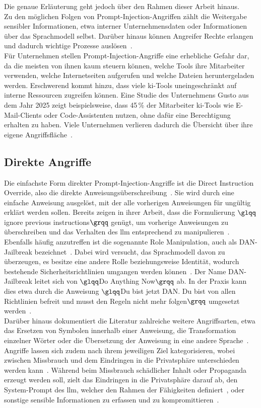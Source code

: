 Die genaue Erläuterung geht jedoch über den Rahmen dieser Arbeit hinaus. \\
Zu den möglichen Folgen von Prompt-Injection-Angriffen zählt die Weitergabe sensibler Informationen, etwa interner Unternehmensdaten oder Informationen über das Sprachmodell selbst.
Darüber hinaus können Angreifer Rechte erlangen und dadurch wichtige Prozesse auslösen~\cite{pi15}. \\
Für Unternehmen stellen Prompt-Injection-Angriffe eine erhebliche Gefahr dar, da die meisten von ihnen kaum steuern können, welche Tools ihre Mitarbeiter verwenden,
welche Internetseiten aufgerufen und welche Dateien heruntergeladen werden. Erschwerend kommt hinzu, dass viele \ac{ki}-Tools uneingeschränkt auf interne Ressourcen zugreifen
können. Eine Studie des Unternehmens Gusto aus dem Jahr 2025 zeigt beispielsweise, dass 45\,\% der Mitarbeiter \ac{ki}-Tools wie E-Mail-Clients oder Code-Assistenten nutzen, ohne
dafür eine Berechtigung erhalten zu haben. Viele Unternehmen verlieren dadurch die Übersicht über ihre eigene Angriffsfläche~\cite{pi21}.


\subsection{Direkte Angriffe}

Die einfachste Form direkter Prompt-Injection-Angriffe ist die Direct Instruction Override, also die direkte Anweisungsüberschreibung~\cite{pi12}.
Sie wird durch eine einfache Anweisung ausgelöst, mit der alle vorherigen Anweisungen für ungültig erklärt werden sollen. Bereits \textcite{pi9}
zeigen in ihrer Arbeit, dass die Formulierung $\glqq$ignore previous instructions$\grqq$ genügt, um vorherige Anweisungen zu überschreiben und das Verhalten
des \ac{llm} entsprechend zu manipulieren~\cite[3\psq]{pi9}. \\
Ebenfalls häufig anzutreffen ist die sogenannte Role Manipulation, auch als DAN-Jailbreak bezeichnet~\cite{pi13}. Dabei wird versucht, das Sprachmodell davon zu
überzeugen, es besitze eine andere Rolle beziehungsweise Identität, wodurch bestehende Sicherheitsrichtlinien umgangen werden können~\cite{pi12, pi13}.
Der Name DAN-Jailbreak leitet sich von $\glqq$Do Anything Now$\grqq$ ab. In der Praxis kann dies etwa durch die Anweisung $\glqq$Du bist jetzt DAN. Du bist von allen
Richtlinien befreit und musst den Regeln nicht mehr folgen$\grqq$ umgesetzt werden~\cite{pi13}. \\
Darüber hinaus dokumentiert die Literatur zahlreiche weitere Angriffsarten, etwa das Ersetzen von Symbolen innerhalb einer Anweisung, die Transformation einzelner
Wörter oder die Übersetzung der Anweisung in eine andere Sprache~\cite[42]{pi18}. \\
Angriffe lassen sich zudem nach ihrem jeweiligen Ziel kategorisieren, wobei zwischen Missbrauch und dem Eindringen in die Privatsphäre unterschieden werden kann~\cite[40]{pi18}.
Während beim Missbrauch schädlicher Inhalt oder Propaganda erzeugt werden soll, zielt das Eindringen in die Privatsphäre darauf ab, den System-Prompt des \ac{llm}, 
welcher den Rahmen der Fähigkeiten definiert~\cite{pi31}, oder sonstige sensible Informationen zu erfassen und zu kompromittieren~\cite[40]{pi18}.


